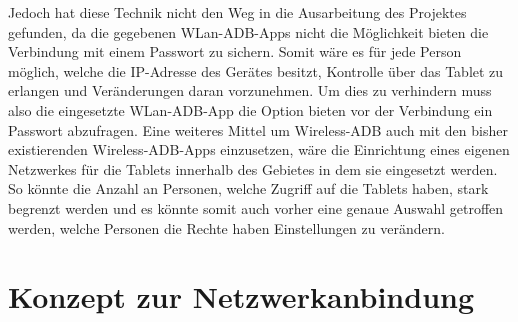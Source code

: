 \begin{flushleft}
Jedoch hat diese Technik nicht den Weg in die Ausarbeitung des Projektes gefunden, da die gegebenen WLan-ADB-Apps nicht die Möglichkeit bieten die Verbindung mit einem Passwort zu sichern. Somit wäre es für jede Person möglich, welche die IP-Adresse des Gerätes besitzt, Kontrolle über das Tablet zu erlangen und Veränderungen daran vorzunehmen. Um dies zu verhindern muss also die eingesetzte WLan-ADB-App die Option bieten vor der Verbindung ein Passwort abzufragen. Eine weiteres Mittel um Wireless-ADB auch mit den bisher existierenden Wireless-ADB-Apps einzusetzen, wäre die Einrichtung eines eigenen Netzwerkes für die Tablets innerhalb des Gebietes in dem sie eingesetzt werden. So könnte die Anzahl an Personen, welche Zugriff auf die Tablets haben, stark begrenzt werden und es könnte somit auch vorher eine genaue Auswahl getroffen werden, welche Personen die Rechte haben Einstellungen zu verändern.

\section{Konzept zur Netzwerkanbindung}

\end{flushleft}
